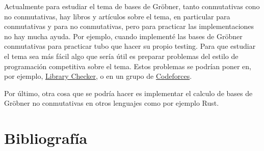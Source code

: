 \documentclass[12pt]{report}
\theoremstyle{customstyle}
\theoremstyle{factstyle}
\begin{document}
Actualmente para estudiar el tema de bases de Gröbner, tanto conmutativas cono no conmutativas, hay libros y artículos sobre el tema, en particular \cite{book:ideals-varieties-algorithms} para conmutativas y \cite{thesis:Hof20} para no conmutativas, pero para practicar las implementaciones no hay mucha ayuda. Por ejemplo, cuando implementé las bases de Gröbner conmutativas para practicar tubo que hacer su propio testing. Para que estudiar el tema sea más fácil algo que sería útil es preparar problemas del estilo de programación competitiva sobre el tema. Estos problemas se podrían poner en, por ejemplo, \href{https://judge.yosupo.jp}{Library Checker}, o en un grupo de \href{https://codeforces.com}{Codeforces}.

Por último, otra cosa que se podría hacer es implementar el calculo de bases de Gröbner no conmutativas en otros lenguajes como por ejemplo Rust.

\chapter{Bibliografía}

\printbibliography[heading=none]
\end{document}

